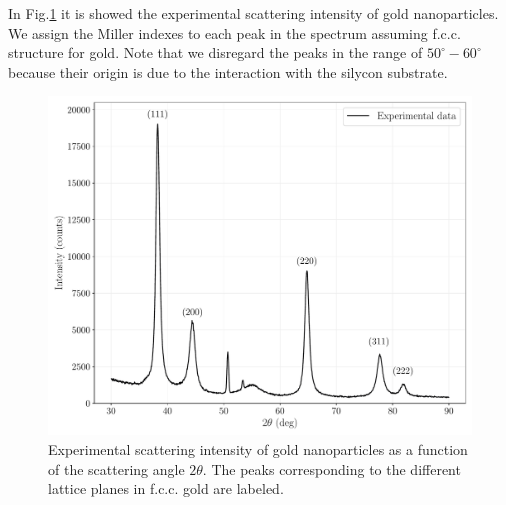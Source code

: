 \documentclass[prb,twocolumn]{revtex4-1}
\begin{document}
In Fig.\ref{fig:scattering_intensity} it is showed the experimental scattering intensity of gold nanoparticles. We assign the Miller indexes to each peak in the spectrum assuming f.c.c.  structure for gold. 
Note that we disregard the peaks in the range of \(50^\circ-60^\circ \) because their origin is due to the interaction with the silycon substrate.

\begin{figure}[htp]
    \begin{minipage}[l]{0.9\columnwidth}
        \includegraphics[width=1.0\textwidth]{images/xrd/scattering_intensity.pdf}
        \caption{Experimental scattering intensity of gold nanoparticles as a function of the scattering angle \(2 \theta\). The peaks corresponding to the different lattice planes in f.c.c. gold are labeled.}
        \label{fig:scattering_intensity}
    \end{minipage}
\end{figure}
\end{document}
